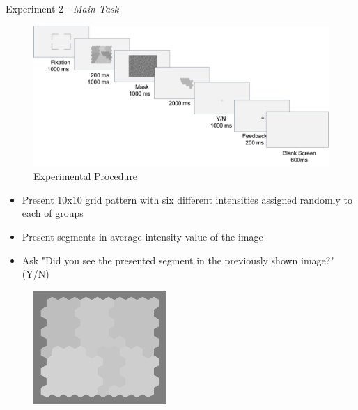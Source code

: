 \documentclass[10pt,xcolor=svgnames]{beamer} %
\begin{document}
\begin{frame}{Experiment 2 - \textit{Main Task}}
\begin{figure}
\centering
    \includegraphics[width = \textwidth]{pictures/ExperimentalProcedure.png}   
\caption{\footnotesize Experimental Procedure}
\end{figure}

\begin{itemize}
    \footnotesize
    \item Present 10x10 grid pattern with six different intensities assigned randomly to each of groups 
    \item Present segments in average intensity value of the image
    \item Ask "Did you see the presented segment in the previously shown image?" (Y/N)
\end{itemize}
\end{frame}

\begin{frame}[standout]
\begin{figure}
\end{figure}
\end{frame}

\begin{frame}[standout]
\begin{figure}
    \centering
    \includegraphics[width=0.45\textwidth]{pictures/grid_init4.png}
    \label{fig:exp_Img}
\end{figure}
\end{frame}
\end{document}
